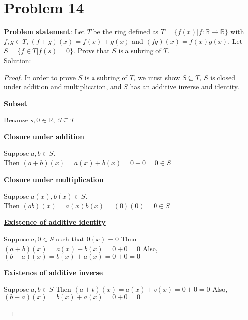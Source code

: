 \documentclass{article} %
\begin{document}
\newpage

\section*{Problem 14}


\textbf{Problem statement}: Let $T$ be the ring defined as $T = \{f(x)|f: \mathbb{R} \rightarrow \mathbb{R}\}$ with $f,g \in T$, $(f + g)(x) = f(x) + g(x)$ and $(fg)(x) = f(x)g(x)$.  Let $S = \{f \in T|f(s) = 0\}$.  Prove that $S$ is a subring of $T$.
\\

\underline{Solution}:
\begin{addmargin}[1em]{0em}
\begin{proof}
In order to prove $S$ is a subring of $T$, we must show $S \subseteq T$, $S$ is closed under addition and multiplication, and $S$ has an additive inverse and identity.
\begin{addmargin}[1em]{0em}
\underline{\textbf{Subset}}
\begin{addmargin}[1em]{0em}
Because $s, 0 \in \mathbb{R}$, $S \subseteq T$
\end{addmargin} 

\underline{\textbf{Closure under addition}}
\begin{addmargin}[1em]{0em}
Suppose $a, b \in S$.
\\Then $(a + b)(x) = a(x) + b(x) = 0 + 0 = 0 \in S$
\end{addmargin}

\underline{\textbf{Closure under multiplication}}
\begin{addmargin}[1em]{0em}
Suppose $a(x), b(x) \in S$.
\\Then $(ab)(x) = a(x)b(x) = (0)(0) = 0 \in S$
\end{addmargin}

\underline{\textbf{Existence of additive identity}}
\begin{addmargin}[1em]{0em}
Suppose $a, 0 \in S$ such that $0(x) = 0$
Then $(a + b)(x) = a(x) + b(x) = 0 + 0 = 0$
Also, $(b + a)(x) = b(x) + a(x) = 0 + 0 = 0$
\end{addmargin}

\underline{\textbf{Existence of additive inverse}}
\begin{addmargin}[1em]{0em}
Suppose $a, b \in S$
Then $(a + b)(x) = a(x) + b(x) = 0 + 0 = 0$
Also, $(b + a)(x) = b(x) + a(x) = 0 + 0 = 0$
\end{addmargin}
\end{addmargin}
\end{proof}
\end{addmargin}
\end{document}
